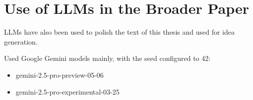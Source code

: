 \section{Use of LLMs in the Broader Paper}
\label{sec:3_4}

LLMs have also been used to polish the text of this thesis and used for idea generation.

Used Google Gemini models mainly, with the seed configured to 42:
\begin{itemize}
    \item gemini-2.5-pro-preview-05-06
    \item gemini-2.5-pro-experimental-03-25
\end{itemize}

